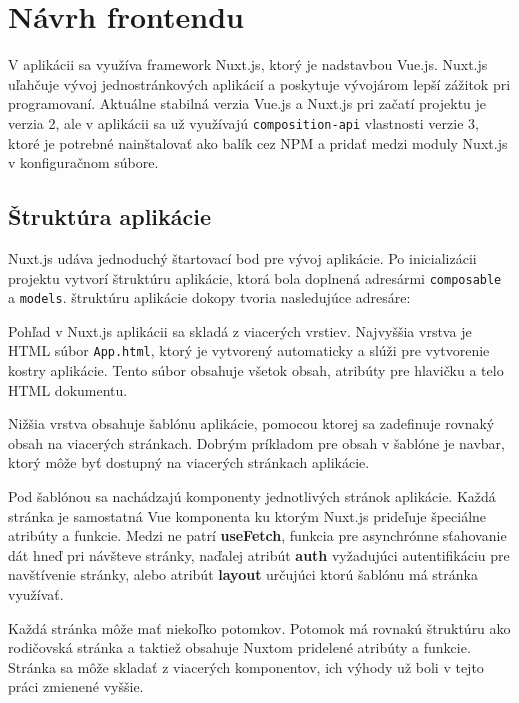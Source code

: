 \section{Návrh frontendu}
V aplikácii sa využíva framework Nuxt.js, ktorý je nadstavbou Vue.js. Nuxt.js uľahčuje vývoj jednostránkových aplikácií a poskytuje vývojárom lepší zážitok pri programovaní. 
Aktuálne stabilná verzia Vue.js a Nuxt.js pri začatí projektu je verzia 2, ale v aplikácii sa už využívajú \texttt{composition-api} vlastnosti verzie 3, ktoré je potrebné nainštalovať ako balík cez NPM a pridať medzi moduly Nuxt.js v konfiguračnom súbore.

\subsection{Štruktúra aplikácie}
Nuxt.js udáva jednoduchý štartovací bod pre vývoj aplikácie. Po inicializácii projektu vytvorí štruktúru aplikácie, ktorá bola doplnená adresármi \texttt{composable} a \texttt{models}. štruktúru aplikácie dokopy tvoria nasledujúce adresáre:

\vspace{5mm}
\vspace{5mm}

Pohľad v Nuxt.js aplikácii sa skladá z viacerých vrstiev. Najvyššia vrstva je HTML súbor \texttt{App.html}, ktorý je vytvorený automaticky a slúži pre vytvorenie kostry aplikácie. Tento súbor obsahuje všetok obsah, atribúty pre hlavičku a telo HTML dokumentu. 

Nižšia vrstva obsahuje šablónu aplikácie, pomocou ktorej sa zadefinuje rovnaký obsah na viacerých stránkach. Dobrým príkladom pre obsah v šablóne je navbar, ktorý môže byť dostupný na viacerých stránkach aplikácie. 

Pod šablónou sa nachádzajú komponenty jednotlivých stránok aplikácie. Každá stránka je samostatná Vue komponenta ku ktorým Nuxt.js prideľuje špeciálne atribúty a funkcie. Medzi ne patrí \textbf{useFetch}, funkcia pre asynchrónne sťahovanie dát hneď pri návšteve stránky, naďalej atribút \textbf{auth} vyžadujúci autentifikáciu pre navštívenie stránky, alebo atribút \textbf{layout} určujúci ktorú šablónu má stránka využívať.

Každá stránka môže mať niekoľko potomkov. Potomok má rovnakú štruktúru ako rodičovská stránka a taktiež obsahuje Nuxtom pridelené atribúty a funkcie. Stránka sa môže skladať z viacerých komponentov, ich výhody už boli v tejto práci zmienené vyššie.

